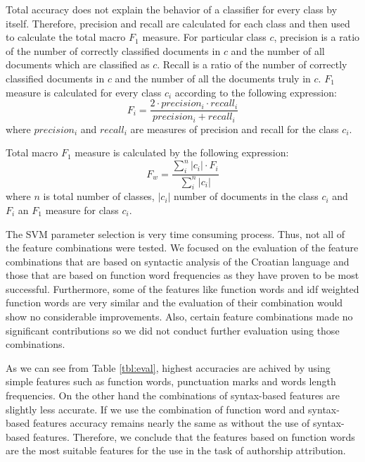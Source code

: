 \documentclass{llncs}
\begin{document}
Total accuracy does not explain the behavior of a classifier for every class by
itself. Therefore, precision and recall are calculated for each class and then
used to calculate the total macro $F_1$ measure. For particular class $c$,
precision is a ratio of the number of correctly classified documents in $c$ and
the number of all documents which are classified as $c$. Recall is a ratio of the
number of correctly classified documents in $c$ and the number of all the
documents truly in $c$. $F_1$ measure is calculated for every class $c_i$
according to the following expression:
\begin{equation}
F_i = \frac{2 \cdot precision_i \cdot recall_i}{precision_i + recall_i}
\end{equation}
where $precision_i$ and $recall_i$ are measures of precision and recall for
the class $c_i$.

Total macro $F_1$ measure is calculated by the following expression:
\begin{equation}
F_w = \frac{\sum^{n}_i |c_i|\cdot F_i}{\sum^n_i|c_i|}
\end{equation}
where $n$ is total number of classes, $|c_i|$ number of documents in the class
$c_i$ and $F_i$ an $F_1$ measure for class $c_i$.

The SVM parameter selection is very time consuming process. Thus, not all of the
feature combinations were tested. We focused on the evaluation of the feature
combinations that are based on syntactic analysis of the Croatian language and
those that are based on function word frequencies as they have proven to be most
successful. Furthermore, some of the features like function words and idf
weighted function words are very similar and the evaluation of their combination
would show no considerable improvements. Also, certain feature combinations made
no significant contributions so we did not conduct further evaluation using
those combinations.

As we can see from Table \ref{tbl:eval}, highest accuracies are achived by using
simple features such as function words, punctuation marks and words length
frequencies. On the other hand the combinations of syntax-based features are
slightly less accurate. If we use the combination of function word and
syntax-based features accuracy remains nearly the same as without the use of syntax-based
features. Therefore, we conclude that the features based on function words are
the most suitable features for the use in the task of authorship attribution.
\end{document}

